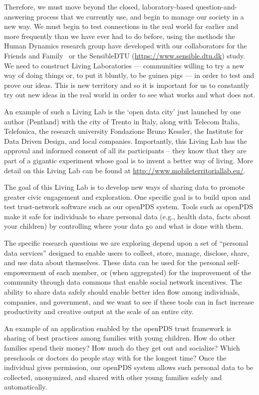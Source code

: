 Therefore, we must move beyond the closed, laboratory-based question-and-answering process that we currently use, and begin to manage our society in a new way.
We must begin to test connections in the real world far earlier and more frequently than we have ever had to do before, using the methods the Human Dynamics research group have developed with our collaborators for the Friends and Family~\cite{aharony2011social} or the SensibleDTU (\url{https://www.sensible.dtu.dk}) study. 
We need to construct Living Laboratories --- communities willing to try a new way of doing things or, to put it bluntly, to be guinea pigs --- in order to test and prove our ideas.
This is new territory and so it is important for us to constantly try out new ideas in the real world in order to see what works and what does not.

An example of such a Living Lab is the `open data city’ just launched by one author (Pentland) with the city of Trento in Italy, along with Telecom Italia, Telefonica, the research university Fondazione Bruno Kessler, the Institute for Data Driven Design, and local companies.
Importantly, this Living Lab has the approval and informed consent of all its participants – they know that they are part of a gigantic experiment whose goal is to invent a better way of living. 
More detail on this Living Lab can be found at \url{http://www.mobileterritoriallab.eu/}.

The goal of this Living Lab is to develop new ways of sharing data to promote greater civic engagement and exploration.
One specific goal is to build upon and test trust-network software such as our openPDS system.
Tools such as openPDS make it safe for individuals to share personal data (e.g., health data, facts about your children) by controlling where your data go and what is done with them.

The specific research questions we are exploring depend upon a set of ``personal data services'' designed to enable users to collect, store, manage, disclose, share, and use data about themselves.
These data can be used for the personal self-empowerment of each member, or (when aggregated) for the improvement of the community through data commons that enable social network incentives.
The ability to share data safely should enable better idea flow among individuals, companies, and government, and we want to see if these tools can in fact increase productivity and creative output at the scale of an entire city.

An example of an application enabled by the openPDS trust framework is sharing of best practices among families with young children.
How do other families spend their money?
How much do they get out and socialize?
Which preschools or doctors do people stay with for the longest time?
Once the individual gives permission, our openPDS system allows such personal data to be collected, anonymized, and shared with other young families safely and automatically.

